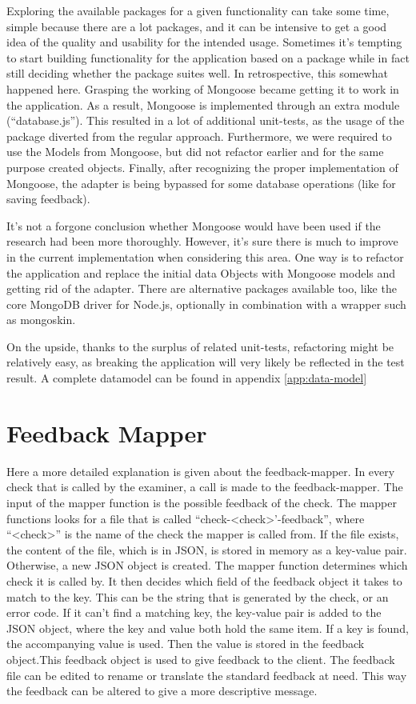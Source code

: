 Exploring the available packages for a given functionality can take some time,
simple because there are a lot packages, and it can be intensive to get a good
idea of the quality and usability for the intended usage. Sometimes it's
tempting to start building functionality for the application based on a package
while in fact still deciding whether the package suites well. In retrospective,
this somewhat happened here. Grasping the working of Mongoose became getting it
to work in the application. As a result, Mongoose is implemented through an 
extra module (``database.js''). This resulted in a lot of additional 
unit-tests, as the usage of the package diverted from the regular approach. 
Furthermore, we were required to use the Models from Mongoose, but did not
refactor earlier and for the same purpose created objects. Finally, after 
recognizing the proper implementation of Mongoose, the adapter is being bypassed
for some database operations (like for saving feedback).

It's not a forgone conclusion whether Mongoose would have been used if the
research had been more thoroughly. However, it's sure there is much to improve
in the current implementation when considering this area. One way is to refactor
the application and replace the initial data Objects with Mongoose models and
getting rid of the adapter. There are alternative packages available too, like 
the core MongoDB driver for Node.js, optionally in combination with a wrapper 
such as mongoskin. 

On the upside, thanks to the surplus of related unit-tests, refactoring might be 
relatively easy, as breaking the application will very likely be reflected in 
the test result. A complete datamodel can be found in 
appendix \ref{app:data-model}

\section{Feedback Mapper}
Here a more detailed explanation is given about the feedback-mapper.
In every \gls{check} that is called by the \gls{examiner}, a call is made to the
feedback-mapper.
The input of the mapper function is the possible feedback of the \gls{check}.
The mapper functions looks for a file that is called 
``check-\textless check\textgreater'-feedback'',
where ``\textless check\textgreater'' is the name of the \gls{check} the mapper 
is called from. If the file exists, the content of the file, which is in JSON,
is stored in memory as a key-value pair.
Otherwise, a new JSON object is created.
The mapper function determines which \gls{check} it is called by.
It then decides which field of the feedback object it takes to match to the key.
This can be the string that is generated by the \gls{check}, or an error code. 
If it can't find a matching key, the key-value pair is added to the JSON object,
where the key and value both hold the same item.
If a key is found, the accompanying value is used. Then the value is stored in 
the feedback object.This feedback object is used to give feedback to the client.
The feedback file can be edited to rename or translate the standard feedback at 
need. This way the feedback can be altered to give a more descriptive message.
    
